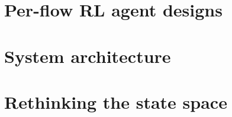 
%





\section{Per-flow RL agent designs}\label{sec:ddos-mitigation-with-per-flow-reinforcement-learning}


\section{System architecture}\label{sec:ddos-architecture}


\section{Rethinking the state space}\label{sec:rethinking-the-state-space}



